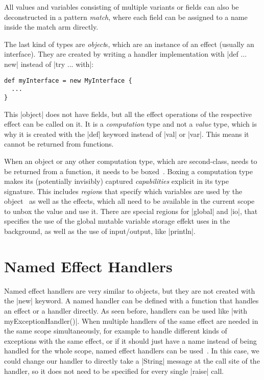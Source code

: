 All values and variables consisting of multiple variants or fields can also be deconstructed in a pattern \textit{match}, where each field can be assigned to a name inside the match arm directly.

The last kind of types are \textit{object}s, which are an instance of an effect (usually an interface). They are created by writing a handler implementation with |def ... new| instead of |try ... with|:

\begin{lstlisting}
def myInterface = new MyInterface {
  ...
}
\end{lstlisting}

This |object| does not have fields, but all the effect operations of the respective effect can be called on it. It is a \textit{computation} type and not a \textit{value} type, which is why it is created with the |def| keyword instead of |val| or |var|. This means it cannot be returned from functions.

When an object or any other computation type, which are second-class, needs to be returned from a function, it needs to be boxed~\cite{brachthauser2022effects}. Boxing a computation type makes its (potentially invisibly) captured \textit{capabilities} explicit in its type signature. This includes \textit{region}s that specify which variables are used by the object~\cite{muller2023capabilities} as well as the effects, which all need to be available in the current scope to unbox the value and use it. There are special regions for |global| and |io|, that specifies the use of the global mutable variable storage effekt uses in the background, as well as the use of input/output, like |println|.

\section{Named Effect Handlers}

Named effect handlers are very similar to objects, but they are not created with the |new| keyword. A named handler can be defined with a function that handles an effect or a handler directly. As seen before, handlers can be used like |with myExceptionHandler()|. When multiple handlers of the same effect are needed in the same scope simultaneously, for example to handle different kinds of exceptions with the same effect, or if it should just have a name instead of being handled for the whole scope, named effect handlers can be used~\cite{xie2022named}. In this case, we could change our handler to directly take a |String| message at the call site of the handler, so it does not need to be specified for every single |raise| call.

